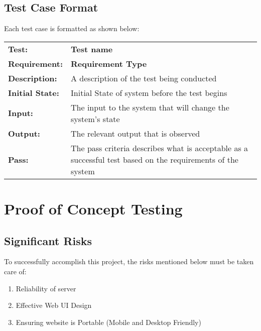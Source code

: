 \documentclass{article}
\begin{document}
	\subsection{Test Case Format}
	Each test case is formatted as shown below:

	\begin{mdframed}[linewidth=1pt]
	\begin{tabularx}{\textwidth}{@{}p{3cm}X@{}}
	{\bf Test:} & {\bf Test name}\\[\baselineskip]
	{\bf Requirement:} & {\bf Requirement Type}\\[\baselineskip]
	{\bf Description:} & A description of the test being conducted\\[0.5\baselineskip]
	{\bf Initial State:} & Initial State of system before the test begins\\[0.5\baselineskip]
	{\bf Input:} &  The input to the system that will change the system's state\\[0.5\baselineskip]
	{\bf Output:} & The relevant output that is observed\\[0.5\baselineskip]
	{\bf Pass:} & The pass criteria describes what is acceptable as a successful test based on the requirements of the system
	\end{tabularx}
	\end{mdframed}
		
	

\newpage


\section{Proof of Concept Testing}
\subsection{Significant Risks}
To successfully accomplish this project, the risks mentioned below must be taken care of:
\begin{enumerate}
	\item Reliability of server
	\item Effective Web UI Design
	\item Ensuring website is Portable (Mobile and Desktop Friendly)
\end{enumerate}
\end{document}
